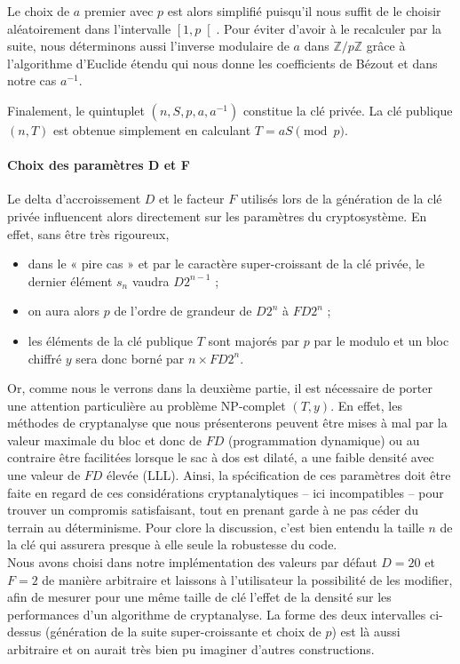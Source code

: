 \documentclass[a4paper,10pt]{article}
\begin{document}
Le choix de $a$ premier avec $p$ est alors simplifié puisqu'il nous suffit de le choisir aléatoirement dans l'intervalle $\left[ 1,p \right[$. Pour éviter d'avoir à le recalculer par la suite, nous déterminons aussi l'inverse modulaire de $a$ dans $\mathbb{Z}/p\mathbb{Z}$ grâce à l'algorithme d'Euclide étendu qui nous donne les coefficients de Bézout et dans notre cas $a^{-1}$.

Finalement, le quintuplet $(n, S, p, a, a^{-1})$ constitue la clé privée. La clé publique $(n, T)$ est obtenue simplement en calculant $T = aS \pmod p$. \\

\paragraph{Choix des paramètres D et F} Le delta d'accroissement $D$ et le facteur $F$ utilisés lors de la génération de la clé privée influencent alors directement sur les paramètres du cryptosystème. En effet, sans être très rigoureux,

\begin{itemize}
\item dans le « pire cas » et par le caractère super-croissant de la clé privée, le dernier élément $s_n$ vaudra $D2^{n-1}$ ;
\item on aura alors $p$ de l'ordre de grandeur de $D2^n$ à $FD2^n$ ;
\item les éléments de la clé publique $T$ sont majorés par $p$ par le modulo et un bloc chiffré $y$ sera donc borné par $n \times FD2^n$.
\end{itemize}


Or, comme nous le verrons dans la deuxième partie, il est nécessaire de porter une attention particulière au problème NP-complet $(T, y)$. En effet, les méthodes de cryptanalyse que nous présenterons peuvent être mises à mal par la valeur maximale du bloc et donc de $FD$ (programmation dynamique) ou au contraire être facilitées lorsque le sac à dos est dilaté, a une faible densité avec une valeur de $FD$ élevée (LLL). Ainsi, la spécification de ces paramètres doit être faite en regard de ces considérations cryptanalytiques – ici incompatibles – pour trouver un compromis satisfaisant, tout en prenant garde à ne pas céder du terrain au déterminisme. Pour clore la discussion, c'est bien entendu la taille $n$ de la clé qui assurera presque à elle seule la robustesse du code.\\
Nous avons choisi dans notre implémentation des valeurs par défaut $D=20$ et $F=2$ de manière arbitraire et laissons à l'utilisateur la possibilité de les modifier, afin de mesurer pour une même taille de clé l'effet de la densité sur les performances d'un algorithme de cryptanalyse. La forme des deux intervalles ci-dessus (génération de la suite super-croissante et choix de $p$) est là aussi arbitraire et on aurait très bien pu imaginer d'autres constructions.
\end{document}
